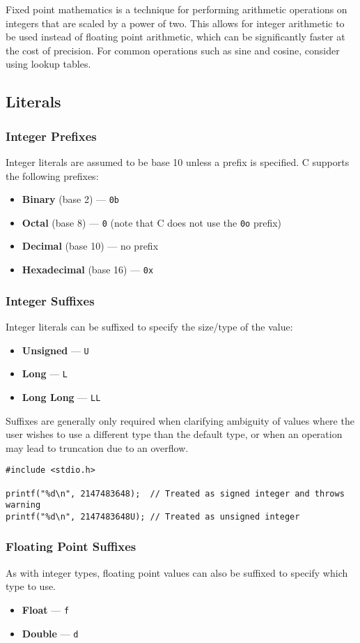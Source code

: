 \documentclass{article}
\begin{document}
Fixed point mathematics is a technique for performing arithmetic
operations on integers that are scaled by a power of two. This allows
for integer arithmetic to be used instead of floating point arithmetic,
which can be significantly faster at the cost of precision. For common
operations such as sine and cosine, consider using lookup tables.
\subsection{Literals}
\subsubsection{Integer Prefixes}
Integer literals are assumed to be base 10 unless a prefix is
specified. C supports the following prefixes:
\begin{itemize}
    \item \textbf{Binary} (base 2) --- \texttt{0b}
    \item \textbf{Octal} (base 8) --- \texttt{0} (note that C does not use the \texttt{0o} prefix)
    \item \textbf{Decimal} (base 10) --- no prefix
    \item \textbf{Hexadecimal} (base 16) --- \texttt{0x}
\end{itemize}
\subsubsection{Integer Suffixes}
Integer literals can be suffixed to specify the size/type of the value:
\begin{itemize}
    \item \textbf{Unsigned} --- \texttt{U}
    \item \textbf{Long} --- \texttt{L}
    \item \textbf{Long Long} --- \texttt{LL}
\end{itemize}
Suffixes are generally only required when clarifying ambiguity of values
where the user wishes to use a different type than the default type, or
when an operation may lead to truncation due to an overflow.
\begin{verbatim}
#include <stdio.h>

printf("%d\n", 2147483648);  // Treated as signed integer and throws warning
printf("%d\n", 2147483648U); // Treated as unsigned integer
\end{verbatim}
\subsubsection{Floating Point Suffixes}
As with integer types, floating point values can also be suffixed to
specify which type to use.
\begin{itemize}
    \item \textbf{Float} --- \texttt{f}
    \item \textbf{Double} --- \texttt{d}
\end{itemize}
\end{document}

